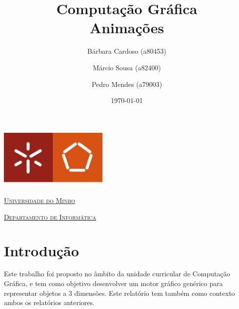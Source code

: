\documentclass[a4paper]{article}
\begin{document}
\title{Computação Gráfica\\ Animações}
\author{Bárbara Cardoso (a80453) \and Márcio Sousa (a82400) \and Pedro Mendes (a79003)}
\date{\today}

\begin{titlepage}

    \thispagestyle{empty}
    \begin{center}
        \begin{minipage}{0.75\linewidth}
            \centering
            \includegraphics[width=0.4\textwidth]{eng.jpeg}\par\vspace{1cm}
            \vspace{1.5cm}
            \href{https://www.uminho.pt/PT}{\scshape\LARGE Universidade do Minho} \par
            \vspace{1cm}
            \href{https://www.di.uminho.pt/}{\scshape\Large Departamento de Informática} \par
            \vspace{1.5cm}

            \maketitle
        \end{minipage}
    \end{center}

\end{titlepage}

\tableofcontents

\pagebreak

\section{Introdução}

Este trabalho foi proposto no âmbito da unidade curricular de Computação Gráfica, e tem como objetivo desenvolver um motor gráfico genérico para representar objetos a 3 dimensões. Este relatório tem também como contexto ambos os relatórios anteriores.
\end{document}
